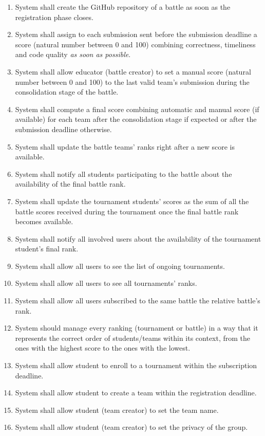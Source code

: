 \begin{enumerate}[label=$\bullet$ \textbf{R\arabic*:}]
    \item System shall create the GitHub repository of a battle as soon as the registration phase closes.
    \item System shall assign to each submission sent before the submission deadline a score (natural number between 0 and 100) combining correctness, timeliness and code quality \textit{as soon as possible}.
    \item System shall allow educator (battle creator) to set a manual score (natural number between 0 and 100) to the last valid team’s submission during the consolidation stage of the battle.
    \item System shall compute a final score combining automatic and manual score (if available) for each team after the consolidation stage if expected or after the submission deadline otherwise.
    \item System shall update the battle teams’ ranks right after a new score is available.
    \item System shall notify all students participating to the battle about the availability of the final battle rank.
    \item System shall update the tournament students’ scores as the sum of all the battle scores received during the tournament once the final battle rank becomes available.
    \item System shall notify all involved users about the availability of the tournament student’s final rank.
    \item System shall allow all users to see the list of ongoing tournaments.
    \item System shall allow all users to see all tournaments’ ranks.
    \item System shall allow all users subscribed to the same battle the relative battle's rank.
    \item System should manage every ranking (tournament or battle) in a way that it represents the correct order of students/teams within its context, from the ones with the highest score to the ones with the lowest.
    \item System shall allow student to enroll to a tournament within the subscription deadline.
    \item System shall allow student to create a team within the registration deadline.
    \item System shall allow student (team creator) to set the team name.
    \item System shall allow student (team creator) to set the privacy of the group.

\end{enumerate}
